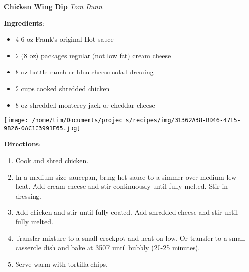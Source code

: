 \documentclass[11pt, twoside, openany]{book}
\begin{document}
\noindent\begin{minipage}[t]{\linewidth}%
{\Large\textbf{Chicken Wing Dip}} \label{chicken-wing-dip}\hfill\textit{Tom Dunn}\\
\noindent\begin{minipage}[t]{0.78\linewidth}%
\textbf{Ingredients}:\vspace{-3mm}
\begin{multicols}{2}
\begin{itemize}\setlength\itemsep{-1mm}
\item 4-6 oz Frank's original Hot sauce
\item 2 (8 oz) packages regular (not low fat) cream cheese
\item 8 oz bottle ranch or bleu cheese salad dressing
\item 2 cups cooked shredded chicken
\item 8 oz shredded monterey jack or cheddar cheese
\end{itemize}
\end{multicols}
\end{minipage}
\noindent\begin{minipage}[t]{0.18\linewidth}
\centering \strut\vspace*{-\baselineskip}\newline
\texttt{[image: /home/tim/Documents/projects/recipes/img/31362A38-BD46-4715-9B26-0AC1C3991F65.jpg]}\\
\end{minipage}\vspace{3mm}
\textbf{Directions}:
\vspace{-3mm}\begin{enumerate}\setlength\itemsep{-1mm}
\item Cook and shred chicken.
\item In a medium-size saucepan, bring hot sauce to a simmer over medium-low heat. Add cream cheese and stir continuously until fully melted. Stir in dressing.
\item Add chicken and stir until fully coated. Add shredded cheese and stir until fully melted.
\item Transfer mixture to a small crockpot and heat on low. Or transfer to a small casserole dish and bake at 350F until bubbly (20-25 minutes). 
\item Serve warm with tortilla chips.
\end{enumerate}
\end{minipage}\vspace{8mm}
\end{document}
